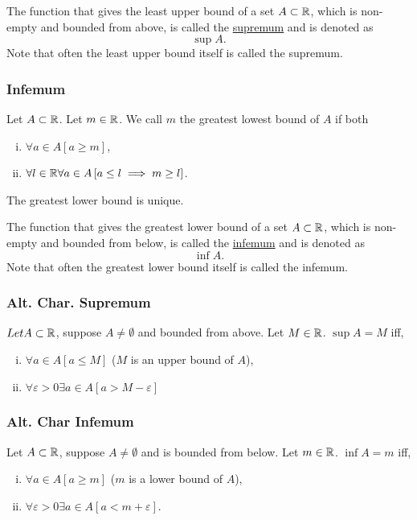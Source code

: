 The function that gives the least upper bound of a set $A \subset \mathbb{R}$, which is
non-empty and bounded from above, is called the \ul{supremum} and is denoted as
\begin{equation*}
    \sup A.
\end{equation*}
Note that often the least upper bound itself is called the supremum.


\subsubsection*{Infemum}
Let $A \subset \mathbb{R}$. Let $m \in \mathbb{R}$. We call $m$ the greatest lowest bound of $A$ if both
\begin{enumerate}[(i)]
    \item $\forall a \in A \left[ a \geq m \right]$,
    \item $\forall l \in \mathbb{R} \forall a \in A \left[ a \leq l \implies m \geq l \right]$.
\end{enumerate}
The greatest lower bound is unique.

The function that gives the greatest lower bound of a set $A \subset \mathbb{R}$, which is
non-empty and bounded from below, is called the \ul{infemum} and is denoted as
\begin{equation*}
    \inf A.
\end{equation*}
Note that often the greatest lower bound itself is called the infemum.


\subsubsection*{Alt. Char. Supremum}
\uthm $Let A \subset \mathbb{R}$, suppose $A \neq \emptyset$ and bounded from above.
Let $M \in \mathbb{R}$. $\sup A = M$ iff,
\begin{enumerate}[(i)]
    \item $\forall a \in A \left[ a \leq M \right]$ ($M$ is an upper bound of $A$),
    \item $\forall \varepsilon > 0 \exists a \in A \left[ a > M - \varepsilon \right]$
\end{enumerate}


\subsubsection*{Alt. Char Infemum}
\uthm Let $A \subset \mathbb{R}$, suppose $A \neq \emptyset$ and is bounded from below.
Let $m \in \mathbb{R}$. $\inf A = m$ iff,
\begin{enumerate}[(i)]
    \item $\forall a \in A \left[ a \geq m \right]$ ($m$ is a lower bound of $A$),
    \item $\forall \varepsilon > 0 \exists a \in A \left[ a < m + \varepsilon \right]$.
\end{enumerate}


